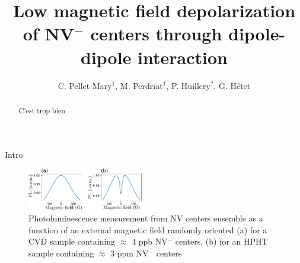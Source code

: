 \documentclass[preprintnumbers,amsmath,amssymb,superscriptaddress,twocolumn,showpacs]{revtex4-2}
\begin{document}
\title{Low magnetic field depolarization of NV$^-$ centers through dipole-dipole interaction}

\author{C. Pellet-Mary$^1$, M. Perdriat$^1$, P. Huillery$^?$,  G. H\'etet} 


\begin{abstract}
C'est trop bien
\end{abstract}

\maketitle

Intro

\begin{figure}
\includegraphics[width=0.45\textwidth]{Figures/fig dense vs pas dense}
\caption{Photoluminescence measurement from NV centers ensemble as a function of an external magnetic field randomly oriented (a) for a CVD sample containing $\approx$ 4 ppb NV$^-$ centers, (b) for an HPHT sample containing $\approx$ 3 ppm NV$^-$ centers}
\label{PL_NV_density}
\end{figure}

%
\end{document}
